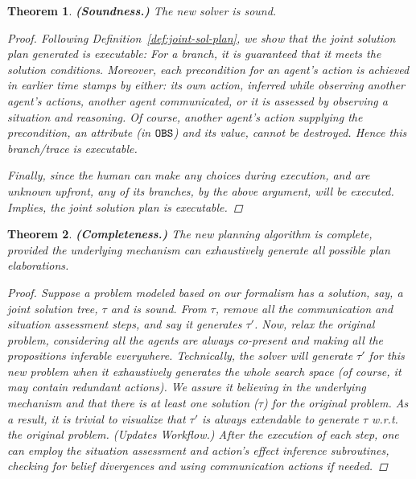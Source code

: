 \documentclass[letterpaper]{article} %
\newtheorem{theorem}{Theorem}[section]
\begin{document}
\begin{theorem}
\textbf{(Soundness.)} The new solver is sound.
\vspace{-0.06in}
\begin{proof}
Following Definition~\ref{def:joint-sol-plan},
we show that the joint solution plan generated is executable:
For a branch, it is guaranteed that it meets the {\em solution conditions}.
Moreover, each precondition for an agent's action is achieved in earlier time stamps by either: its own action, 
\textit{inferred} while observing another agent's actions, 
another agent \textit{communicated},
or it is \textit{assessed} by observing a situation and reasoning.
Of course, another agent’s action supplying the precondition, an attribute (in $\texttt{OBS}$) and its value, cannot be destroyed. 
Hence this branch/trace is executable.

Finally, since the human can make any choices during execution,
and are unknown upfront, any of its branches, by the
above argument, will be executed. 
Implies, the joint solution plan is executable.
\end{proof}
\end{theorem}

\begin{theorem}
\textbf{(Completeness.)} The new planning algorithm is complete, provided the underlying mechanism can exhaustively generate all possible plan elaborations. 
\vspace{-0.06in}
\begin{proof}
Suppose a problem modeled based on our formalism has a solution, say, a joint solution tree, $\tau$ and is sound. 
From $\tau$, remove all the communication and situation assessment steps, and say it generates $\tau'$. Now, relax the original problem, considering all the agents are always co-present and making all the propositions \textit{inferable} everywhere. 
Technically, the solver will generate $\tau'$ for this new problem when it exhaustively generates the whole search space (of course, it may contain redundant actions). 
We assure it believing in the underlying mechanism and that there is at least one solution ($\tau$) for the original problem. As a result, it is trivial to visualize that $\tau'$ is always extendable to generate $\tau$ w.r.t. the original problem. (\textit{Updates Workflow}.) After the execution of each step, one can employ the situation assessment and action's effect inference subroutines, checking for belief divergences and using communication actions if needed. 
\end{proof}
\end{theorem}
\end{document}
